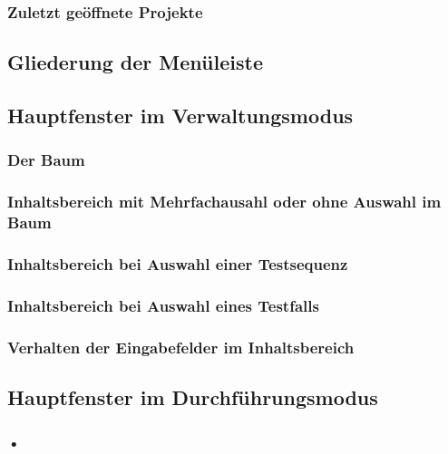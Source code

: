 \documentclass[a4paper,10pt]{scrartcl}
\begin{document}
\subsubsection{Zuletzt geöffnete Projekte}
\subsection{Gliederung der Menüleiste}
\subsection{Hauptfenster im Verwaltungsmodus}
\subsubsection{Der Baum}
\subsubsection{Inhaltsbereich mit Mehrfachausahl oder ohne Auswahl im Baum}
\subsubsection{Inhaltsbereich bei Auswahl einer Testsequenz}
\subsubsection{Inhaltsbereich bei Auswahl eines Testfalls}
\subsubsection{Verhalten der Eingabefelder im Inhaltsbereich}
\subsection{Hauptfenster im Durchführungsmodus}
\subsubsection{•}
\end{document}
